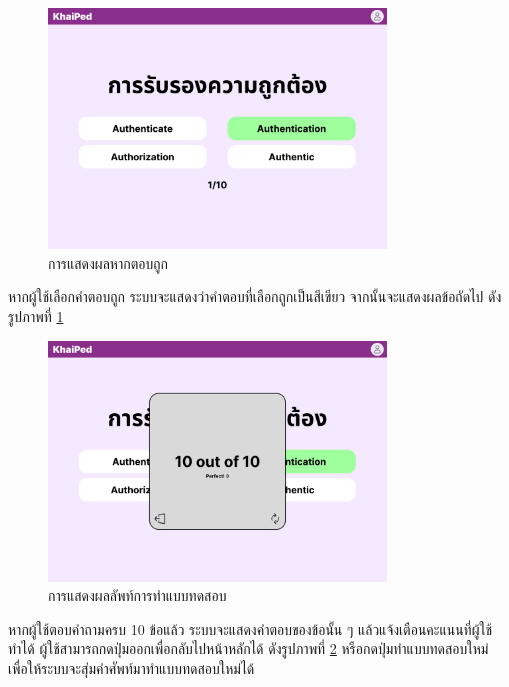 \documentclass[12pt,oneside,openright,a4paper]{cpe-thai-project}
\begin{document}
\pagebreak
\begin{figure}[!h]\centering
	\includegraphics[width=0.8\textwidth, keepaspectratio=true]{image/chap3/ui/quiz/Quiz - Correct Answer.png}
	\caption{การแสดงผลหากตอบถูก}\label{fig:UI_QuizCorrect}
\end{figure}
\hspace{1cm}
หากผู้ใช้เลือกคำตอบถูก ระบบจะแสดงว่าคำตอบที่เลือกถูกเป็นสีเขียว จากนั้นจะแสดงผลข้อถัดไป ดังรูปภาพที่ \ref{fig:UI_QuizCorrect}

\begin{figure}[!h]\centering
	\includegraphics[width=0.8\textwidth, keepaspectratio=true]{image/chap3/ui/quiz/Quiz - Result.png}
	\caption{การแสดงผลลัพท์การทำแบบทดสอบ}\label{fig:UI_QuizResult}
\end{figure}
\hspace{1cm}
หากผู้ใช้ตอบคำถามครบ 10 ข้อแล้ว ระบบจะแสดงคำตอบของข้อนั้น ๆ แล้วแจ้งเตือนคะแนนที่ผู้ใช้ทำได้ ผู้ใช้สามารถกดปุ่มออกเพื่อกลับไปหน้าหลักได้ ดังรูปภาพที่ \ref{fig:UI_QuizResult}
หรือกดปุ่มทำแบบทดสอบใหม่ เพื่อให้ระบบจะสุ่มคำศัพท์มาทำแบบทดสอบใหม่ได้

\pagebreak
\end{document}
